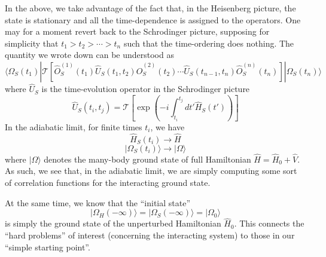 In the above, we take advantage of the fact that, in the Heisenberg picture, the state is stationary and all the time-dependence is assigned to the operators. One may for a moment revert back to the Schrodinger picture, supposing for simplicity that $t_1>t_2>\cdots>t_n$ such that the time-ordering does nothing. The quantity we wrote down can be understood as
\[ \langle \Omega _S\left( t_1 \right) |\mathcal{T} \left[ \hat{O}_{S}^{\left( 1 \right)}\left( t_1 \right) \hat{U}_S\left( t_1,t_2 \right) \hat{O}_{S}^{\left( 2 \right)}\left( t_2 \right) \cdots \hat{U}_S\left( t_{n-1},t_n \right) \hat{O}_{S}^{\left( n \right)}\left( t_n \right) \right] |\Omega _S\left( t_n \right) \rangle \]
where $\hat{U}_S$ is the time-evolution operator in the Schrodinger picture
\[ \hat{U}_S\left( t_i,t_j \right) =\mathcal{T} \left[ \exp \left( -i\int_{t_i}^{t_j}{dt'\hat{H}_S\left( t' \right)} \right) \right] \]
In the adiabatic limit, for finite times $t_i$, we have
\[ \hat{H}_S\left( t_i \right) \rightarrow \hat{H}\]
\[ |\Omega _S\left( t_i \right) \rangle \rightarrow |\Omega \rangle \]
where $|\Omega\rangle$ denotes the many-body ground state of full Hamiltonian $\hat{H}=\hat{H}_0+\hat{V}$. As such, we see that, in the adiabatic limit, we are simply computing some sort of correlation functions for the interacting ground state.

At the same time, we know that the ``initial state''
\[ |\Omega _H\left( -\infty \right) \rangle =|\Omega _S\left( -\infty \right) \rangle =|\Omega _0\rangle \]
is simply the ground state of the unperturbed Hamiltonian $\hat{H}_0$. This connects the ``hard problems'' of interest (concerning the interacting system) to those in our ``simple starting point''.

